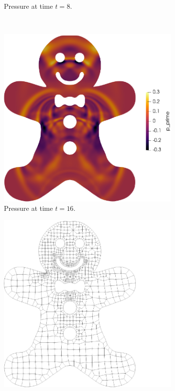 \documentclass[hidelinks]{juliacon} %
\begin{document}
\begin{figure}[!h]
\begin{subfigure}{0.475\linewidth}
    \caption{Pressure at time $t = 8$.}
  \end{subfigure}%
  \\
  \begin{subfigure}{0.475\linewidth}
    \includegraphics[width=\textwidth]{../figures/ginger_time_16}
    \caption{Pressure at time $t = 16$.}
  \end{subfigure}%
  \hspace*{\fill}
  \begin{subfigure}{0.475\linewidth}
    \includegraphics[width=\textwidth]{../figures/ginger_mesh}

\end{subfigure}
\end{figure}
\end{document}
